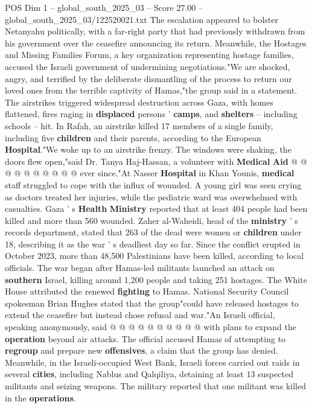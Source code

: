 \begin{textsample}{POS Dim 1 – global\_south\_2025\_03 – Score 27.00 – global\_south\_2025\_03/122520021.txt}
The escalation appeared to bolster Netanyahu politically, with a far-right party that had previously withdrawn from his government over the ceasefire announcing its return.
Meanwhile, the Hostages and Missing Families Forum, a key organization representing hostage families, accused the Israeli government of undermining negotiations."We are shocked, angry, and terrified by the deliberate dismantling of the process to return our loved ones from the terrible captivity of Hamas,"the group said in a statement.
The airstrikes triggered widespread destruction across Gaza, with homes flattened, fires raging in \textbf{displaced} persons ' \textbf{camps}, and \textbf{shelters} -- including schools -- hit.
In Rafah, an airstrike killed 17 members of a single family, including five \textbf{children} and their parents, according to the European \textbf{Hospital}."We woke up to an airstrike frenzy.
The windows were shaking, the doors flew open,"said Dr.
Tanya Haj-Hassan, a volunteer with \textbf{Medical} \textbf{Aid} @ @ @ @ @ @ @ @ @ @ ever since."At Nasser \textbf{Hospital} in Khan Younis, \textbf{medical} staff struggled to cope with the influx of wounded.
A young girl was seen crying as doctors treated her injuries, while the pediatric ward was overwhelmed with casualties.
Gaza ' s \textbf{Health} \textbf{Ministry} reported that at least 404 people had been killed and more than 560 wounded.
Zaher al-Waheidi, head of the \textbf{ministry} ' s records department, stated that 263 of the dead were women or \textbf{children} under 18, describing it as the war ' s deadliest day so far.
Since the conflict erupted in October 2023, more than 48,500 Palestinians have been killed, according to local officials.
The war began after Hamas-led militants launched an attack on \textbf{southern} Israel, killing around 1,200 people and taking 251 hostages.
The White House attributed the renewed \textbf{fighting} to Hamas.
National Security Council spokesman Brian Hughes stated that the group"could have released hostages to extend the ceasefire but instead chose refusal and war."An Israeli official, speaking anonymously, said @ @ @ @ @ @ @ @ @ @ with plans to expand the \textbf{operation} beyond air attacks.
The official accused Hamas of attempting to \textbf{regroup} and prepare new \textbf{offensives}, a claim that the group has denied.
Meanwhile, in the Israeli-occupied West Bank, Israeli forces carried out raids in several \textbf{cities}, including Nablus and Qalqiliya, detaining at least 13 suspected militants and seizing weapons.
The military reported that one militant was killed in the \textbf{operations}.

\end{textsample}
